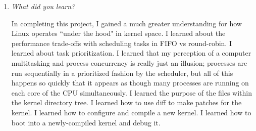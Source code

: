 \documentclass[letterpaper,10pt,titlepage]{article}
\newcommand{\tab}{\hspace*{2em}} %
\begin{document}
\begin{enumerate}
\item \emph{What did you learn?}

\tab In completing this project, I gained a much greater understanding for how Linux operates ``under the hood" in kernel space. I learned about the performance trade-offs with scheduling tasks in FIFO vs round-robin. I learned about task prioritization. I learned that my perception of a computer multitasking and process concurrency is really just an illusion; processes are run sequentially in a prioritized fashion by the scheduler, but all of this happens so quickly that it appears as though many processes are running on each core of the CPU simultaneously. I learned the purpose of the files within the kernel directory tree. I learned how to use diff to make patches for the kernel. I learned how to configure and compile a new kernel. I learned how to boot into a newly-compiled kernel and debug it.

\end{enumerate}

%
\end{document}
